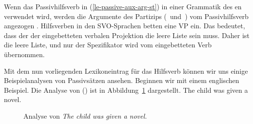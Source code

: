 \noindent
Wenn das Passivhilfsverb in (\ref{le-passive-aux-arg-st}) in einer Grammatik des en verwendet wird, werden die
Argumente des Partizips (\, und \,) vom Passivhilfsverb angezogen
\citep{HN89a,HN94a}.
Hilfsverben in den SVO-Sprachen betten eine VP ein. Das bedeutet, dass der \compsw der eingebetteten verbalen
Projektion die leere Liste sein muss. Daher ist  die leere Liste, und nur der Spezifikator  wird
vom eingebetteten Verb übernommen.


Mit dem nun vorliegenden Lexikoneintrag für das Hilfsverb können wir uns einige Beispielanalysen von
Passivsätzen ansehen. Beginnen wir mit einem englischen Beispiel. Die Analyse von () ist in
Abbildung~\ref{fig-the-child-was-given-a-novel} dargestellt.
\ea
The child was given a novel.
\z
\begin{figure}
\caption{\label{fig-the-child-was-given-a-novel}Analyse von \emph{The child was given a novel.}}
\end{figure}

